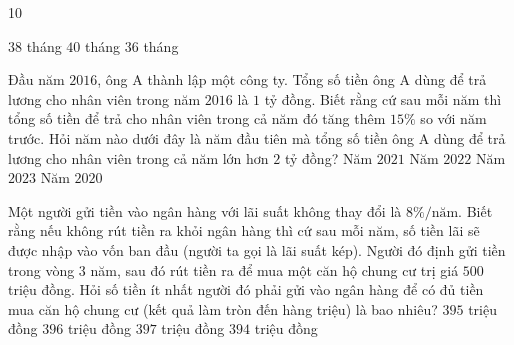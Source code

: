 \begin{indapan}{10}
\begin{ex}
	{$38$ tháng}
	{$40$ tháng}
	{$36$ tháng}
\end{ex}
\begin{ex}
	Đầu năm $2016$, ông A thành lập một công ty. Tổng số tiền ông A dùng để trả lương cho nhân viên trong năm $2016$ là $1$ tỷ đồng. Biết rằng cứ sau mỗi năm thì tổng số tiền để trả cho nhân viên trong cả năm đó tăng thêm $15\%$ so với năm trước. Hỏi năm nào dưới đây là năm đầu tiên mà tổng số tiền ông A dùng để trả lương cho nhân viên trong cả năm lớn hơn $2$ tỷ đồng?
	\choice
	{\True  Năm $2021$ }
	{Năm $2022$}
	{Năm $2023$}
	{Năm $2020$}
\end{ex}
\begin{ex}
	Một người gửi tiền vào ngân hàng với lãi suất không thay đổi là $8\%/\text{năm}$. Biết rằng nếu không rút tiền ra khỏi ngân hàng thì cứ sau mỗi năm, số tiền lãi sẽ được nhập vào vốn ban đầu (người ta gọi là lãi suất kép). Người đó định gửi tiền trong vòng $3$ năm, sau đó rút tiền ra để mua một căn hộ chung cư trị giá $500$ triệu đồng. Hỏi số tiền ít nhất người đó phải gửi vào ngân hàng để có đủ tiền mua căn hộ chung cư (kết quả làm tròn đến hàng triệu) là bao nhiêu?
	\choice
	{$395$ triệu đồng}
	{$396$ triệu đồng}
	{\True $397$ triệu đồng}
	{$394$ triệu đồng}
\end{ex}
\end{indapan}
